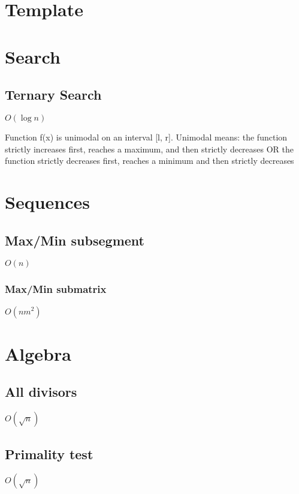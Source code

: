 \documentclass{article}
\begin{document}
\tableofcontents 

\section{Template}


\section{Search}
\subsection{Ternary Search}
$O(\log{n})$

Function f(x) is unimodal on an interval [l, r]. Unimodal means: the function strictly increases first, reaches a maximum, and then strictly decreases OR the function strictly decreases first, reaches a minimum and then strictly decreases


\section{Sequences}
\subsection{Max/Min subsegment}
$O(n)$


\subsubsection{Max/Min submatrix}
$O(nm^2)$


\section{Algebra}
\subsection{All divisors}
$O(\sqrt{n})$


\subsection{Primality test}
$O(\sqrt{n})$

\end{document}
